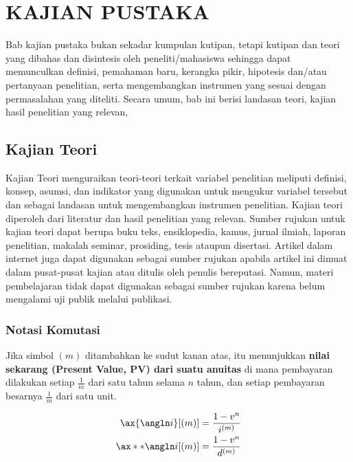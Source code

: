 \chapter{KAJIAN PUSTAKA}
Bab kajian pustaka bukan sekadar kumpulan kutipan, tetapi kutipan dan teori yang dibahas dan disintesis oleh peneliti/mahasiswa sehingga dapat memunculkan definisi, pemahaman baru, kerangka pikir, hipotesis dan/atau pertanyaan penelitian, serta mengembangkan instrumen yang sesuai dengan permasalahan yang diteliti. Secara umum, bab ini berisi landasan teori, kajian hasil penelitian yang relevan,

\section{Kajian Teori}
Kajian Teori menguraikan teori-teori terkait variabel penelitian meliputi definisi, konsep, asumsi, dan indikator yang digunakan untuk mengukur variabel tersebut dan sebagai landasan untuk mengembangkan instrumen penelitian. Kajian teori diperoleh dari literatur dan hasil penelitian yang relevan. Sumber rujukan untuk kajian teori dapat berupa buku teks, ensiklopedia, kamus, jurnal ilmiah, laporan penelitian, makalah seminar, prosiding, tesis ataupun disertasi. Artikel dalam internet juga dapat digunakan sebagai sumber rujukan apabila artikel ini dimuat dalam pusat-pusat kajian atau ditulis oleh penulis bereputasi. Namun, materi pembelajaran tidak dapat digunakan sebagai sumber rujukan karena belum mengalami uji publik melalui publikasi.

\subsection{Notasi Komutasi}
Jika simbol \( (m) \) ditambahkan ke sudut kanan atas, itu menunjukkan \textbf{nilai sekarang (Present Value, PV) dari suatu anuitas} di mana pembayaran dilakukan setiap \( \frac{1}{m} \) dari satu tahun selama \( n \) tahun, dan setiap pembayaran besarnya \( \frac{1}{m} \) dari satu unit.


\begin{align*}
	\ax{\angln i}[\left(m\right)] &= \frac{1 - v^n}{i^{(m)}}\\
	\ax**{\angln i}[\left(m\right)]  &= \frac{1 - v^n}{d^{(m)}}
\end{align*}


